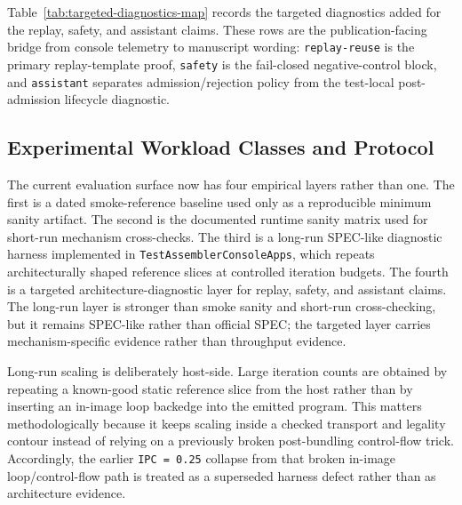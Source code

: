 \documentclass[twocolumn]{article}
\begin{document}


Table~\ref{tab:targeted-diagnostics-map} records the targeted diagnostics added for the replay, safety, and assistant claims. These rows are the publication-facing bridge from console telemetry to manuscript wording: \texttt{replay-reuse} is the primary replay-template proof, \texttt{safety} is the fail-closed negative-control block, and \texttt{assistant} separates admission/rejection policy from the test-local post-admission lifecycle diagnostic.




\subsection{Experimental Workload Classes and Protocol}

The current evaluation surface now has four empirical layers rather than one. The first is a dated smoke-reference baseline used only as a reproducible minimum sanity artifact. The second is the documented runtime sanity matrix used for short-run mechanism cross-checks. The third is a long-run SPEC-like diagnostic harness implemented in \texttt{TestAssemblerConsoleApps}, which repeats architecturally shaped reference slices at controlled iteration budgets. The fourth is a targeted architecture-diagnostic layer for replay, safety, and assistant claims. The long-run layer is stronger than smoke sanity and short-run cross-checking, but it remains SPEC-like rather than official SPEC; the targeted layer carries mechanism-specific evidence rather than throughput evidence.

Long-run scaling is deliberately host-side. Large iteration counts are obtained by repeating a known-good static reference slice from the host rather than by inserting an in-image loop backedge into the emitted program. This matters methodologically because it keeps scaling inside a checked transport and legality contour instead of relying on a previously broken post-bundling control-flow trick. Accordingly, the earlier \texttt{IPC = 0.25} collapse from that broken in-image loop/control-flow path is treated as a superseded harness defect rather than as architecture evidence.


\end{document}
